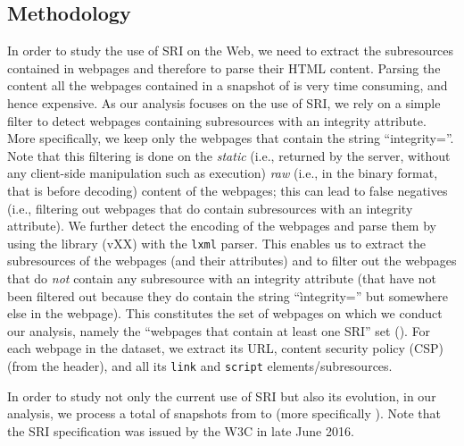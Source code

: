 \documentclass[sigconf,table]{acmart}
\begin{document}
\subsection{Methodology}


In order to study the use of SRI on the Web, we need to extract the subresources contained in webpages and therefore to parse their HTML content.
Parsing the content all the webpages contained in a snapshot of \CC is very time consuming, and hence expensive.
As our analysis focuses on the use of SRI, we rely on a simple filter to detect webpages containing subresources with an integrity attribute.
More specifically, we keep only the webpages that contain the string ``integrity=''.
Note that this filtering is done on the \emph{static} (i.e., returned by the server, without any client-side manipulation such as \JS execution) \emph{raw} (i.e., in the binary format, that is before decoding) content of the webpages; this can lead to false negatives (i.e., filtering out webpages that do contain subresources with an integrity attribute).
We further detect the encoding of the webpages and parse them by using the \texttt{\BS} library (vXX) with the \texttt{lxml} parser.
This enables us to extract the subresources of the webpages (and their attributes) and to filter out the webpages that do \emph{not} contain any subresource with an integrity attribute (that have not been filtered out because they do contain the string ``ìntegrity='' but somewhere else in the webpage).
This constitutes the set of webpages on which we conduct our analysis, namely the ``webpages that contain at least one SRI'' set (\CCSRI).
For each webpage in the \CCSRI dataset, we extract its URL, content security policy (CSP) (from the header),  and all its \texttt{link} and \texttt{script} elements/subresources.

In order to study not only the current use of SRI but also its evolution, in our analysis, we process a total of \CCSnapshotN \CC snapshots from \CCSnapshotEarliest to \CCSnapshotLatest (more specifically \CCSnapshotDates).
Note that the SRI specification was issued by the W3C in late June 2016.


%
\end{document}
